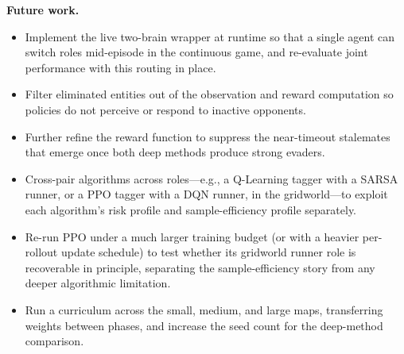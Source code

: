 \documentclass[conference]{IEEEtran}
\begin{document}
\textbf{Future work.}
\begin{itemize}
    \item[(i)] Implement the live two-brain wrapper at runtime so that
    a single agent can switch roles mid-episode in the continuous
    game, and re-evaluate joint performance with this routing in
    place.
    \item[(ii)] Filter eliminated entities out of the observation and
    reward computation so policies do not perceive or respond to
    inactive opponents.
    \item[(iii)] Further refine the reward function to suppress the
    near-timeout stalemates that emerge once both deep methods
    produce strong evaders.
    \item[(iv)] Cross-pair algorithms across roles---e.g., a Q-Learning
    tagger with a SARSA runner, or a PPO tagger with a DQN runner, in
    the gridworld---to exploit each algorithm's risk profile and
    sample-efficiency profile separately.
    \item[(v)] Re-run PPO under a much larger training budget (or
    with a heavier per-rollout update schedule) to test whether its
    gridworld runner role is recoverable in principle, separating the
    sample-efficiency story from any deeper algorithmic limitation.
    \item[(vi)] Run a curriculum across the small, medium, and large
    maps, transferring weights between phases, and increase the seed
    count for the deep-method comparison.
\end{itemize}
\end{document}
